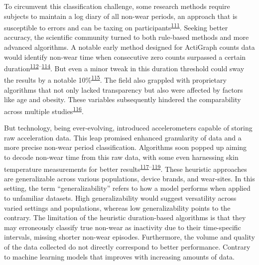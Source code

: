 \documentclass[
  10pt,
]{scrbook}
\begin{document}
To circumvent this classification challenge, some research methods
require subjects to maintain a log diary of all non-wear periods, an
approach that is susceptible to errors and can be taxing on
participants\textsuperscript{\protect\hyperlink{ref-ainsworth_recommendations_2012}{111}}.
Seeking better accuracy, the scientific community turned to both
rule-based methods and more advanced algorithms. A notable early method
designed for ActiGraph counts data would identify non-wear time when
consecutive zero counts surpassed a certain
duration\textsuperscript{\protect\hyperlink{ref-hecht_methodology_2009}{112}--\protect\hyperlink{ref-troiano_how_2020}{114}}.
But even a minor tweak in this duration threshold could sway the results
by a notable
10\%\textsuperscript{\protect\hyperlink{ref-aadland_comparison_2018}{115}}.
The field also grappled with proprietary algorithms that not only lacked
transparency but also were affected by factors like age and obesity.
These variables subsequently hindered the comparability across multiple
studies\textsuperscript{\protect\hyperlink{ref-toftager_accelerometer_2013}{116}}.

But technology, being ever-evolving, introduced accelerometers capable
of storing raw acceleration data. This leap promised enhanced
granularity of data and a more precise non-wear period classification.
Algorithms soon popped up aiming to decode non-wear time from this raw
data, with some even harnessing skin temperature measurements for better
results\textsuperscript{\protect\hyperlink{ref-duncan_wear-time_2018}{117}--\protect\hyperlink{ref-zhou_classification_2015}{119}}.
These heuristic approaches are generalizable across various populations,
device brands, and wear-sites. In this setting, the term
``generalizability'' refers to how a model performs when applied to
unfamiliar datasets. High generalizability would suggest versatility
across varied settings and populations, whereas low generalizability
points to the contrary. The limitation of the heuristic duration-based
algorithms is that they may erroneously classify true non-wear as
inactivity due to their time-specific intervals, missing shorter
non-wear episodes. Furthermore, the volume and quality of the data
collected do not directly correspond to better performance. Contrary to
machine learning models that improves with increasing amounts of data.
\end{document}
